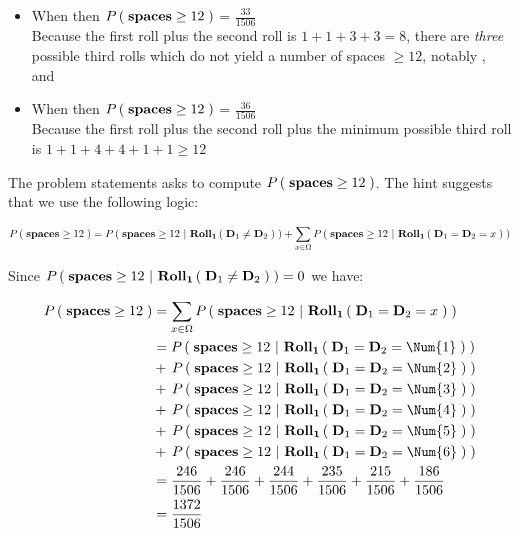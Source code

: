 \documentclass{ProblemSetCUNY}
\newcommand{\Prob}[1]{\ensuremath{P\Parens{#1}}\xspace}
\begin{document}
\begin{itemize}
\begin{itemize}
\item When  then \Prob{\textbf{spaces} \ge 12} = $\frac{33}{1506}$\\
Because the first roll plus the second roll is $1 + 1 + 3 + 3 = 8$, there are \emph{three} possible third rolls which do not yield a number of spaces $\ge 12$, notably  ,  and 
\item When  then \Prob{\textbf{spaces} \ge 12} = $\frac{36}{1506}$\\
Because the first roll plus the second roll plus the minimum possible third roll is $1 + 1 + 4 + 4 + 1 + 1 \ge 12$

\end{itemize}

\end{itemize}

\pagebreak

The problem statements asks to compute $\Prob{\textbf{spaces} \ge 12}$. The hint suggests that we use the following logic:

\[
\Prob{\textbf{spaces} \ge 12} = \Prob{\textbf{spaces} \ge 12~|~\Roll{1}{\Die{1} \not= \Die{2}}} + \sum\limits_{x \in \Omega} \Prob{\textbf{spaces} \ge 12~|~ \Roll{1}{\Die{1} = \Die{2} = x}}
\]

Since $\Prob{\textbf{spaces} \ge 12~|~\Roll{1}{\Die{1} \not= \Die{2}}} = 0$ we have:

\begin{align*}
\Prob{\textbf{spaces} \ge 12}  &= \sum\limits_{x \in \Omega} \Prob{\textbf{spaces} \ge 12~|~ \Roll{1}{\Die{1} = \Die{2} = x}}\\
&= \Prob{\textbf{spaces} \ge 12~|~ \Roll{1}{\Die{1} = \Die{2} = \Num{1}}}\\
&+\,\Prob{\textbf{spaces} \ge 12~|~ \Roll{1}{\Die{1} = \Die{2} = \Num{2}}}\\
&+\,\Prob{\textbf{spaces} \ge 12~|~ \Roll{1}{\Die{1} = \Die{2} = \Num{3}}}\\
&+\,\Prob{\textbf{spaces} \ge 12~|~ \Roll{1}{\Die{1} = \Die{2} = \Num{4}}}\\
&+\,\Prob{\textbf{spaces} \ge 12~|~ \Roll{1}{\Die{1} = \Die{2} = \Num{5}}}\\
&+\,\Prob{\textbf{spaces} \ge 12~|~ \Roll{1}{\Die{1} = \Die{2} = \Num{6}}}\\
&= \frac{246}{1506} + \frac{246}{1506} + \frac{244}{1506} + \frac{235}{1506} + \frac{215}{1506} + \frac{186}{1506}\\
&=\frac{1372}{1506}
\end{align*}
\end{document}
